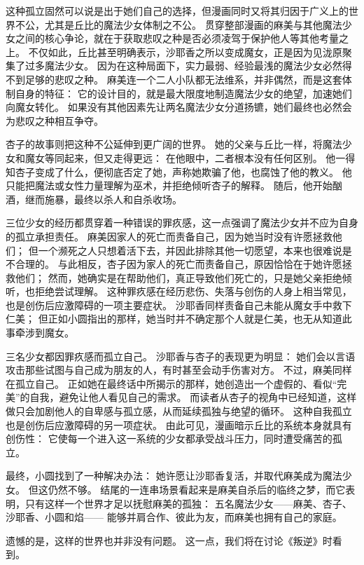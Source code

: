 这种孤立固然可以说是出于她们自己的选择，但漫画同时又将其归因于广义上的世界不公，尤其是丘比的魔法少女体制之不公。
贯穿整部漫画的麻美与其他魔法少女之间的核心争论，就在于获取悲叹之种是否必须凌驾于保护他人等其他考量之上。
不仅如此，丘比甚至明确表示，沙耶香之所以变成魔女，正是因为见泷原聚集了过多魔法少女。
因为在这种局面下，实力最弱、经验最浅的魔法少女必然得不到足够的悲叹之种。
麻美连一个二人小队都无法维系，并非偶然，而是这套体制自身的特征：
它的设计目的，就是最大限度地制造魔法少女的绝望，加速她们向魔女转化。
如果没有其他因素先让两名魔法少女分道扬镳，她们最终也必然会为悲叹之种相互争夺。

杏子的故事则把这种不公延伸到更广阔的世界。
她的父亲与丘比一样，将魔法少女和魔女等同起来，但又走得更远：
在他眼中，二者根本没有任何区别。
他一得知杏子变成了什么，便彻底否定了她，声称她欺骗了他，也腐蚀了他的教义。
他只能把魔法或女性力量理解为巫术，并拒绝倾听杏子的解释。
随后，他开始酗酒，继而施暴，最终以杀人和自杀收场。

三位少女的经历都贯穿着一种错误的罪疚感，这一点强调了魔法少女并不应为自身的孤立承担责任。
麻美因家人的死亡而责备自己，因为她当时没有许愿拯救他们；
但一个濒死之人只想着活下去，并因此排除其他一切愿望，本来也很难说是不合理的。
与此相反，杏子因为家人的死亡而责备自己，原因恰恰在于她许愿拯救他们；
然而，她确实是在帮助他们，真正导致他们死亡的，只是她父亲拒绝倾听，也拒绝尝试理解。
这种罪疚感在经历悲伤、失落与创伤的人身上相当常见，也是创伤后应激障碍的一项主要症状\cite{apa2000dsm-iv-tr}。
沙耶香同样责备自己未能从魔女手中救下仁美；
但正如小圆指出的那样，她当时并不确定那个人就是仁美，也无从知道此事牵涉到魔女。

三名少女都因罪疚感而孤立自己。
沙耶香与杏子的表现更为明显：
她们会以言语攻击那些试图与自己成为朋友的人，有时甚至会动手伤害对方。
不过，麻美同样在孤立自己。
正如她在最终话中所揭示的那样，她创造出一个虚假的、看似“完美”的自我，避免让他人看见自己的需求。
而读者从杏子的视角中已经知道，这样做只会加剧他人的自卑感与孤立感，从而延续孤独与绝望的循环。
这种自我孤立也是创伤后应激障碍的另一项症状\cite{apa2000dsm-iv-tr}。
由此可见，漫画暗示丘比的系统本身就具有创伤性：
它使每一个进入这一系统的少女都承受战斗压力，同时遭受痛苦的孤立。

最终，小圆找到了一种解决办法：
她许愿让沙耶香复活，并取代麻美成为魔法少女。
但这仍然不够。
结尾的一连串场景看起来是麻美自杀后的临终之梦，而它表明，只有这样一个世界才足以抚慰麻美的孤独：
五名魔法少女——麻美、杏子、沙耶香、小圆和焰——
能够并肩合作、彼此为友，而麻美也拥有自己的家庭。

遗憾的是，这样的世界也并非没有问题。
这一点，我们将在讨论《叛逆》时看到。
